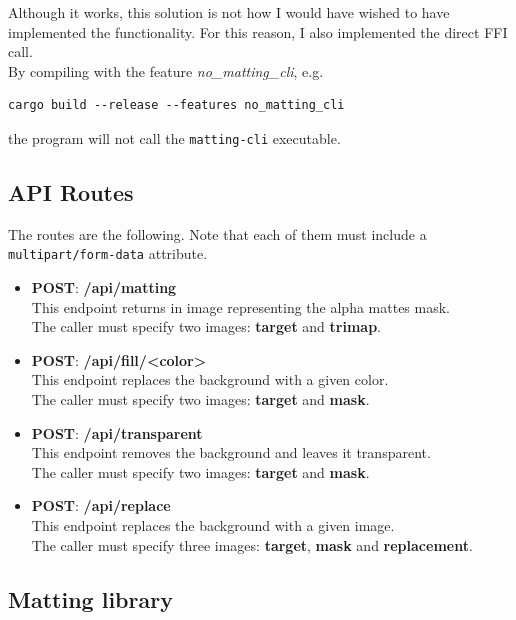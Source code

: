 \documentclass[a4paper]{article}
\begin{document}
Although it works, this solution is not how I would have wished to have implemented
the functionality. For this reason, I also implemented the direct FFI call. \\
By compiling with the feature \textit{no\_matting\_cli}, e.g.
\begin{lstlisting}[style=Rust, style=boxed]
    cargo build --release --features no_matting_cli
\end{lstlisting}
the program will not call the \texttt{matting-cli} executable.

\pagebreak

\subsection{API Routes}

The routes are the following.
Note that each of them must include
a \texttt{multipart/form-data} attribute.

\begin{itemize}
    \item \textbf{POST}: \textbf{/api/matting} \\
        This endpoint returns in image representing the alpha mattes mask. \\
        The caller must specify two images: \textbf{target} and \textbf{trimap}.
    \item \textbf{POST}: \textbf{/api/fill/<color>} \\
        This endpoint replaces the background with a given color. \\
        The caller must specify two images: \textbf{target} and \textbf{mask}.
    \item \textbf{POST}: \textbf{/api/transparent} \\
        This endpoint removes the background and leaves it transparent. \\
        The caller must specify two images: \textbf{target} and \textbf{mask}.
    \item \textbf{POST}: \textbf{/api/replace} \\
        This endpoint replaces the background with a given image. \\
        The caller must specify three images: \textbf{target}, \textbf{mask} and \textbf{replacement}.
\end{itemize}

\subsection{Matting library}
\end{document}
